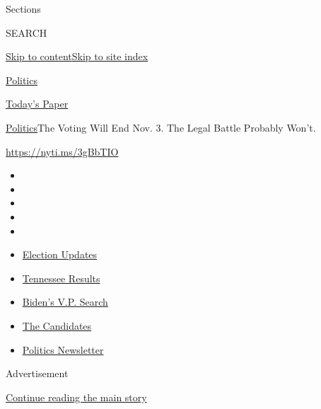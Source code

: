 Sections

SEARCH

\protect\hyperlink{site-content}{Skip to
content}\protect\hyperlink{site-index}{Skip to site index}

\href{https://www.nytimes.com/section/politics}{Politics}

\href{https://myaccount.nytimes.com/auth/login?response_type=cookie\&client_id=vi}{}

\href{https://www.nytimes.com/section/todayspaper}{Today's Paper}

\href{/section/politics}{Politics}\textbar{}The Voting Will End Nov. 3.
The Legal Battle Probably Won't.

\href{https://nyti.ms/3gBbTIO}{https://nyti.ms/3gBbTIO}

\begin{itemize}
\item
\item
\item
\item
\item
\end{itemize}

\begin{itemize}
\item
  \href{https://www.nytimes.com/2020/08/07/us/elections/biden-vs-trump.html?action=click\&pgtype=Article\&state=default\&region=TOP_BANNER\&context=storylines_menu}{Election
  Updates}
\item
  \href{https://www.nytimes.com/interactive/2020/08/06/us/elections/results-tennessee-primary-elections.html?action=click\&pgtype=Article\&state=default\&region=TOP_BANNER\&context=storylines_menu}{Tennessee
  Results}
\item
  \href{https://www.nytimes.com/article/biden-vice-president-2020.html?action=click\&pgtype=Article\&state=default\&region=TOP_BANNER\&context=storylines_menu}{Biden's
  V.P. Search}
\item
  \href{https://www.nytimes.com/interactive/2019/us/politics/2020-presidential-candidates.html?action=click\&pgtype=Article\&state=default\&region=TOP_BANNER\&context=storylines_menu}{The
  Candidates}
\item
  \href{https://www.nytimes.com/newsletters/politics?action=click\&pgtype=Article\&state=default\&region=TOP_BANNER\&context=storylines_menu}{Politics
  Newsletter}
\end{itemize}

Advertisement

\protect\hyperlink{after-top}{Continue reading the main story}

